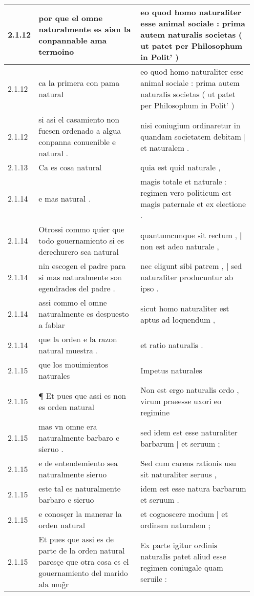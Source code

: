 \begin{tabular}{|p{1cm}|p{6.5cm}|p{6.5cm}|}
2.1.12 & por que el omne naturalmente es aian la conpannable ama termoino & eo quod homo naturaliter esse animal sociale : prima autem naturalis societas ( ut patet per Philosophum in Polit’ ) \\\hline
2.1.12 & ca la primera con pama natural & eo quod homo naturaliter esse animal sociale : prima autem naturalis societas ( ut patet per Philosophum in Polit’ ) \\\hline
2.1.12 & si asi el casamiento non fuesen ordenado a algua conpanna conuenible e natural . & nisi coniugium ordinaretur in quandam societatem debitam | et naturalem . \\\hline
2.1.13 & Ca es cosa natural & quia est quid naturale , \\\hline
2.1.14 & e mas natural . & magis totale et naturale : regimen vero politicum est magis paternale et ex electione . \\\hline
2.1.14 & Otrossi commo quier que todo gouernamiento si es derechurero sea natural & quantumcunque sit rectum , | non est adeo naturale , \\\hline
2.1.14 & nin escogen el padre para si mas naturalmente son egendrades del padre . & nec eligunt sibi patrem , | sed naturaliter producuntur ab ipso . \\\hline
2.1.14 & assi commo el omne naturalmente es despuesto a fablar & sicut homo naturaliter est aptus ad loquendum , \\\hline
2.1.14 & que la orden e la razon natural muestra . & et ratio naturalis . \\\hline
2.1.15 & que los mouimientos naturales & Impetus naturales \\\hline
2.1.15 & ¶ Et pues que assi es non es orden natural & Non est ergo naturalis ordo , virum praeesse uxori eo regimine \\\hline
2.1.15 & mas vn omne era naturalmente barbaro e sieruo . & sed idem est esse naturaliter barbarum | et seruum ; \\\hline
2.1.15 & e de entendemiento sea naturalmente sieruo & Sed cum carens rationis usu sit naturaliter seruus , \\\hline
2.1.15 & este tal es naturalmente barbaro e sieruo & idem est esse natura barbarum et seruum . \\\hline
2.1.15 & e conosçer la manerar la orden natural & et cognoscere modum | et ordinem naturalem ; \\\hline
2.1.15 & Et pues que assi es de parte de la orden natural paresçe que otra cosa es el gouernamiento del marido ala mug̃r & Ex parte igitur ordinis naturalis patet aliud esse regimen coniugale quam seruile : \\\hline

\end{tabular}
